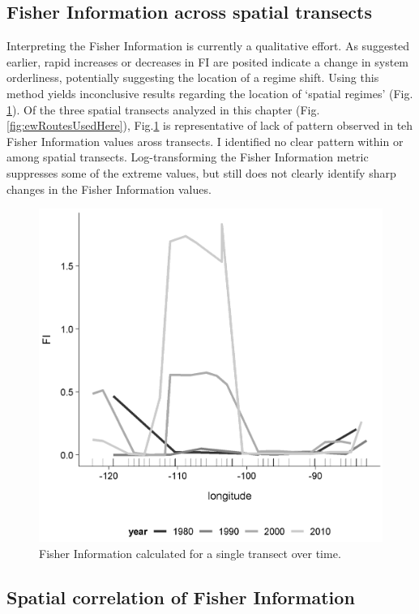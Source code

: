 \documentclass[12pt,twoside,openany]{reedthesis}
\begin{document}
\hypertarget{fisher-information-across-spatial-transects}{%
\subsection{Fisher Information across spatial transects}\label{fisher-information-across-spatial-transects}}

Interpreting the Fisher Information is currently a qualitative effort. As suggested earlier, rapid increases or decreases in FI are posited indicate a change in system orderliness, potentially suggesting the location of a regime shift. Using this method yields inconclusive results regarding the location of `spatial regimes' (Fig. \ref{fig:fi1Tsect}). Of the three spatial transects analyzed in this chapter (Fig. \ref{fig:ewRoutesUsedHere}), Fig.\ref{fig:fi1Tsect} is representative of lack of pattern observed in teh Fisher Information values aross transects. I identified no clear pattern within or among spatial transects. Log-transforming the Fisher Information metric suppresses some of the extreme values, but still does not clearly identify sharp changes in the Fisher Information values.
\begin{figure}[h]

{\centering \includegraphics[width=0.85\linewidth]{./chapterFiles/fisherSpatial/figures/figsCalledInDiss/transect_12_East-West_metric_FI_Eqn7_12} 

}

\caption{Fisher Information calculated for a single transect over time.}\label{fig:fi1Tsect}
\end{figure}
\hypertarget{spatial-correlation-of-fisher-information-1}{%
\subsection{Spatial correlation of Fisher Information}\label{spatial-correlation-of-fisher-information-1}}
\end{document}
